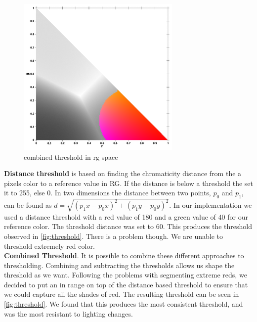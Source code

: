 \begin{multicols}{2}
	\begin{figure}[H]
		\centering
		\includegraphics[width=1\linewidth]{figure/Analysis/thresholdcolor.png}
		\caption{combined threshold in rg space}
		\label{fig:threshold}
	\end{figure}	
\end{multicols}
\textbf{Distance threshold} is based on finding the chromaticity distance from the a pixels color to a reference value in RG. If the distance is below a threshold the set it to 255, else 0. In two dimensions the distance between two points, $p_0$ and $p_1$, can be found as $d = \sqrt{(p_1x - p_0x)^2 +(p_1y - p_0y)^2}$. In our implementation we used a distance threshold with a red value of 180 and a green value of 40 for our reference color. The threshold distance was set to 60. This produces the threshold observed in \autoref{fig:threshold}. There is a problem though. We are unable to threshold extremely red color.\\

\textbf{Combined Threshold}. It is possible to combine these different approaches to thresholding. Combining and subtracting the thresholds allows us shape the threshold as we want. Following the problems with segmenting extreme reds, we decided to put an in range on top of the distance based threshold to ensure that we could capture all the shades of red. The resulting threshold can be seen in \autoref{fig:threshold}. We found that this produces the most consistent threshold, and was the most resistant to lighting changes.

